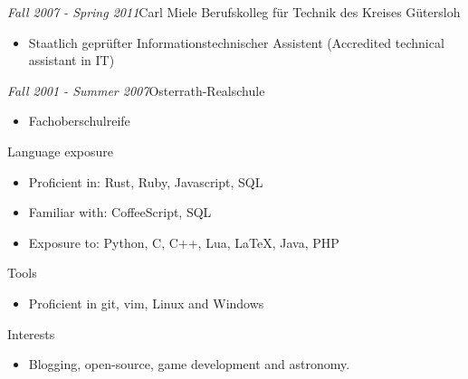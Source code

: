 \documentclass[12pt]{article}
\begin{document}
\emph{Fall 2007 - Spring 2011}\hfill Carl Miele Berufskolleg für Technik des Kreises Gütersloh
\begin{itemize}
  \setlength{\itemsep}{0cm}
  \setlength{\parskip}{0.1cm}
  \item[] Staatlich geprüfter Informationstechnischer Assistent (Accredited technical assistant in IT)
\end{itemize}

\emph{Fall 2001 - Summer 2007}\hfill Osterrath-Realschule
\begin{itemize}
  \setlength{\itemsep}{0cm}
  \setlength{\parskip}{0.1cm}
  \item[] Fachoberschulreife
\end{itemize}

\vspace{0.5cm}
{\Large Language exposure}
\begin{itemize}
  \setlength{\itemsep}{0cm}
  \setlength{\parskip}{0cm}
  \item[] Proficient in: Rust, Ruby, Javascript, SQL
  \item[] Familiar with: CoffeeScript, SQL
  \item[] Exposure to: Python, C, C++, Lua, LaTeX, Java, PHP
\end{itemize}

\vspace{0.5cm}
{\Large Tools}
\begin{itemize}
  \setlength{\itemsep}{0cm}
  \setlength{\parskip}{0cm}
  \item[] Proficient in git, vim, Linux and Windows
\end{itemize}

\vspace{0.5cm}
{\Large Interests}
\begin{itemize}
  \setlength{\itemsep}{0cm}
  \setlength{\parskip}{0cm}
  \item[] Blogging, open-source, game development and astronomy.
\end{itemize}
\end{document}
